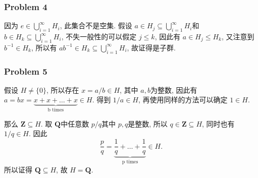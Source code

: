 \documentclass[a4paper,12pt]{ctexart}
\newcommand{\Z}{\mathbf{Z}}
\newcommand{\Q}{\mathbf{Q}}
\begin{document}
\subsubsection*{Problem 4}
      
      因为 $ e\in\bigcup_{i=1}^{\infty}H_i $, 此集合不是空集.
      假设 $ a\in H_j\subseteq\bigcup_{i=1}^{\infty}H_i $和
       $ b\in H_k\subseteq\bigcup_{i=1}^{\infty}H_i $, 
      不失一般性的可以假定 $ j\leq k $, 
      因此有 $ a\in H_j\leq H_k $, 又注意到 $ b^{-1}\in H_k $, 所以有
      $ ab^{-1}\in H_k\subseteq\bigcup_{i=1}^{\infty}H_i $, 故证得是子群.

\subsubsection*{Problem 5}

      假设 $ H\neq\{0\} $, 所以存在 $ x=a/b\in H $, 其中 $ a,b $为整数, 
      因此有 $ a = bx = \underbrace{x+x+\dots +x}_{\text{b times}} \in H $.
      得到 $ 1/a\in H $, 再使用同样的方法可以确定 $ 1\in H $.

      那么 $ \Z\subseteq H $. 取 $ \Q $中任意数 $ p/q $其中 $ p,q $是整数, 
      所以 $ q\in\Z\subseteq H $, 同时也有 $ 1/q\in H $. 因此
      \[\frac p q = \underbrace{\frac 1 q + \dots + \frac 1 q}_{\text{p times}} \in H.\] 
      所以证得 $ \Q\subseteq H $, 故 $ H=\Q $.
\end{document}
